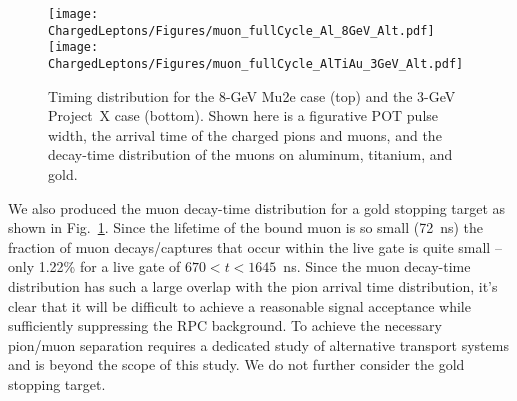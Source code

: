 


\begin{figure}[htb]
  \centering
  \texttt{[image: ChargedLeptons/Figures/muon\_fullCycle\_Al\_8GeV\_Alt.pdf]}
  \texttt{[image: ChargedLeptons/Figures/muon\_fullCycle\_AlTiAu\_3GeV\_Alt.pdf]}
  \caption{Timing distribution for the 8-GeV Mu2e case (top) and the 3-GeV Project~X case (bottom).  Shown
  here is a figurative POT pulse width, the arrival time of the
  charged pions and muons, and the decay-time distribution of the
  muons on aluminum, titanium, and gold.}
  \label{cl:fig:timing}
\end{figure}


We also produced the muon decay-time distribution for a gold stopping
target as shown in Fig.~\ref{cl:fig:timing}.  Since the lifetime of
the bound muon is so small (72~ns) the fraction of muon
decays/captures that occur within the live gate is quite small -- only
1.22\% for a live gate of $670 < t < 1645$~ns.  Since the muon
decay-time distribution has such a large overlap with the pion arrival
time distribution, it's clear that it will be difficult to achieve a
reasonable signal acceptance while sufficiently suppressing the RPC
background.  To achieve the necessary pion/muon separation requires a
dedicated study of alternative transport systems and is beyond the
scope of this study. We do not further consider the gold stopping
target.



